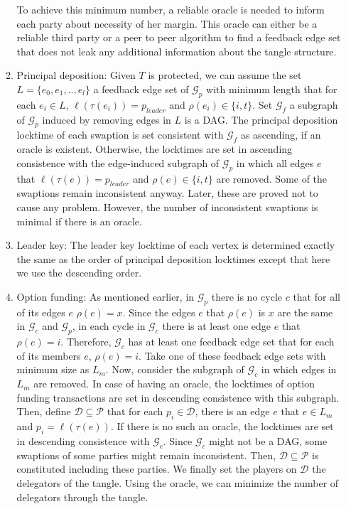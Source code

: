 \begin{enumerate}
\begin{enumerate}
        To achieve this minimum number, a reliable oracle is needed to inform each party about necessity of her margin. This oracle can either be a reliable third party or a peer to peer algorithm to find a feedback edge set that does not leak any additional information about the tangle structure.

        \item Principal deposition: Given $T$ is protected, we can assume the set $L=\{e_0, e_1, .., e_l\}$ a feedback edge set of $\mathcal{G}_{p}$ with minimum length that for each $e_i \in L$, $\ell(\tau(e_i)) = p_{leader}$ and $\rho(e_i) \in \{i, t\}$. Set $\mathcal{G}_f$ a subgraph of $\mathcal{G}_{p}$ induced by removing edges in $L$ is a DAG. The principal deposition locktime of each swaption is set consistent with $\mathcal{G}_f$ as ascending, if an oracle is existent.
        Otherwise, the locktimes are set in ascending consistence with 
        the edge-induced subgraph of $\mathcal{G}_{p}$ in which all edges $e$ that $\ell(\tau(e)) = p_{leader}$ and $\rho(e) \in \{i, t\}$ are removed. 
        Some of the swaptions remain inconsistent anyway. 
        Later, these are proved not to cause any problem.
        However, the number of inconsistent swaptions is minimal if there is an oracle.

        \item Leader key: The leader key locktime of each vertex is determined exactly the same as the order of principal deposition locktimes except that here we use the descending order.
        \item Option funding: As mentioned earlier, in $\mathcal{G}_{p}$ there is no cycle $c$ that for all of its edges $e$  $\rho(e) = x$. Since the edges $e$ that $\rho(e)$ is $x$ are the same in $\mathcal{G}_{c}$ and $\mathcal{G}_{p}$, in each cycle in $\mathcal{G}_{c}$ there is at least one edge $e$ that $\rho(e) = i$.
        Therefore, $\mathcal{G}_{c}$ has at least one feedback edge set that for each of its members $e$, $\rho(e) = i$. Take one of these feedback edge sets with minimum size as $L_{m}$.
        Now, consider the subgraph of $\mathcal{G}_{c}$ in which edges in $L_m$ are removed.
        In case of having an oracle, the locktimes of option funding transactions are set in descending consistence with this subgraph. 
        Then, define $\mathcal{D} \subseteq \mathcal{P}$ that for each $p_i \in \mathcal{D}$, there is an edge $e$ that $e \in L_m$ and $p_i = \ell(\tau(e))$. 
        If there is no such an oracle, the locktimes are set in descending consistence with $\mathcal{G}_{c}$. Since $\mathcal{G}_{c}$ might not be a DAG, some swaptions of some parties might remain inconsistent. Then, $\mathcal{D} \subseteq \mathcal{P}$ is constituted including these parties. 
        We finally set the players on $\mathcal{D}$ the delegators of the tangle. Using the oracle, we can minimize the number of delegators through the tangle.


\end{enumerate}
\end{enumerate}
